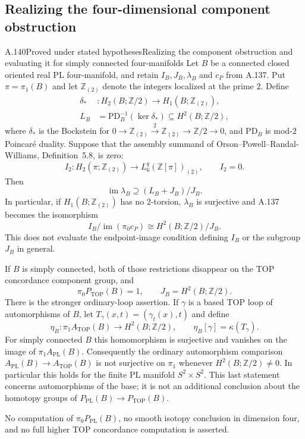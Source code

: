 \subsection{Realizing the four-dimensional component obstruction}

\begin{saresult}{A.140}{Proved under stated hypotheses}{Realizing the component obstruction and evaluating it for simply connected four-manifolds}
Let $B$ be a connected closed oriented real PL four-manifold, and
retain $I_B,J_B,\lambda_B$ and $c_P$ from A.137. Put
$\pi=\pi_1(B)$ and let $\mathbb Z_{(2)}$ denote the integers
localized at the prime $2$. Define
\[
 \begin{split}
 \delta_* &: H_2(B;\mathbb Z/2)\longrightarrow
                         H_1(B;\mathbb Z_{(2)}),\\
 L_B&=\mathrm{PD}_B^{-1}(\ker\delta_*)
                      \subseteq H^2(B;\mathbb Z/2),
 \end{split}                                             \tag{A.140.1}
\]
where $\delta_*$ is the Bockstein for
$0\to\mathbb Z_{(2)}\xrightarrow{2}\mathbb Z_{(2)}
\to\mathbb Z/2\to0$, and $\mathrm{PD}_B$ is mod-$2$
Poincar\'e duality. Suppose that the assembly summand of
Orson--Powell--Randal-Williams, Definition~5.8, is zero:
\[
 I_2:H_2(\pi;\mathbb Z_{(2)})
       \longrightarrow L^q_6(\mathbb Z[\pi])_{(2)},
 \qquad I_2=0.                                          \tag{A.140.2}
\]
Then
\[
 \operatorname{im}\lambda_B
       \supseteq (L_B+J_B)/J_B.                          \tag{A.140.3}
\]
In particular, if $H_1(B;\mathbb Z_{(2)})$ has no $2$-torsion,
$\lambda_B$ is surjective and A.137 becomes the isomorphism
\[
 I_B/\operatorname{im}(\pi_0c_P)
          \cong H^2(B;\mathbb Z/2)/J_B.                 \tag{A.140.4}
\]
This does not evaluate the endpoint-image condition defining $I_B$
or the subgroup $J_B$ in general.

If $B$ is simply connected, both of those restrictions disappear
on the TOP concordance component group, and
\[
       \pi_0P_{\mathrm{TOP}}(B)=1,
       \qquad J_B=H^2(B;\mathbb Z/2).                   \tag{A.140.5}
\]
There is the stronger ordinary-loop assertion. If $\gamma$ is a
based TOP loop of automorphisms of $B$, let
$T_\gamma(x,t)=(\gamma_t(x),t)$ and define
\[
 \eta_B:\pi_1 A_{\mathrm{TOP}}(B)\longrightarrow
                  H^2(B;\mathbb Z/2),
 \qquad \eta_B[\gamma]=\kappa(T_\gamma).                \tag{A.140.6}
\]
For simply connected $B$ this homomorphism is surjective and
vanishes on the image of $\pi_1A_{\mathrm{PL}}(B)$.
Consequently the ordinary automorphism comparison
$A_{\mathrm{PL}}(B)\to A_{\mathrm{TOP}}(B)$ is not surjective
on $\pi_1$ whenever $H^2(B;\mathbb Z/2)\ne0$. In particular
this holds for the finite PL manifold $S^2\times S^2$.
This last statement concerns automorphisms of the base; it is
not an additional conclusion about the homotopy groups of
$P_{\mathrm{PL}}(B)\to P_{\mathrm{TOP}}(B)$.

No computation of $\pi_0P_{\mathrm{PL}}(B)$, no smooth isotopy
conclusion in dimension four, and no full higher TOP concordance
computation is asserted.
\end{saresult}
